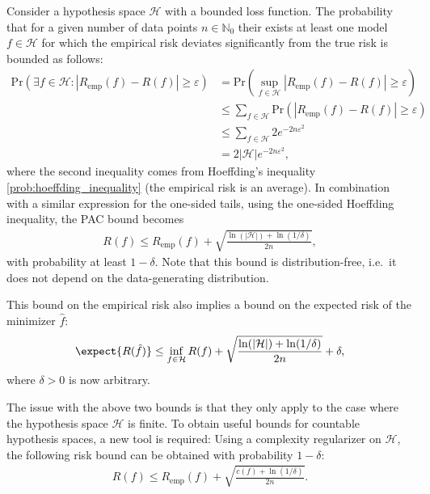     \begin{property}
        Consider a hypothesis space $\mathcal{H}$ with a bounded loss function. The probability that for a given number of data points $n\in\mathbb{N}_0$ their exists at least one model $f\in\mathcal{H}$ for which the empirical risk deviates significantly from the true risk is bounded as follows:
        \begin{align}
            \mathrm{Pr}(\exists f\in\mathcal{H}:|R_\mathrm{emp}(f)-R(f)|\geq\varepsilon) &= \mathrm{Pr}(\sup_{f\in\mathcal{H}}|R_\mathrm{emp}(f)-R(f)|\geq\varepsilon)\nonumber\\
            &\leq\sum_{f\in\mathcal{H}}\mathrm{Pr}(|R_\mathrm{emp}(f)-R(f)|\geq\varepsilon)\nonumber\\
            &\leq\sum_{f\in\mathcal{H}}2e^{-2n\varepsilon^2}\nonumber\\
            &=2|\mathcal{H}|e^{-2n\varepsilon^2},
        \end{align}
        where the second inequality comes from Hoeffding's inequality \ref{prob:hoeffding_inequality} (the empirical risk is an average). In combination with a similar expression for the one-sided tails, using the one-sided Hoeffding inequality, the PAC bound becomes
        \begin{gather}
            R(f)\leq R_\mathrm{emp}(f) + \sqrt{\frac{\ln(|\mathcal{H}|)+\ln(1/\delta)}{2n}},
        \end{gather}
        with probability at least $1-\delta$. Note that this bound is distribution-free, i.e.~it does not depend on the data-generating distribution.

        This bound on the empirical risk also implies a bound on the expected risk of the minimizer $\hat{f}$:
        \begin{gather}
            \expect{R(\hat{f})}\leq\inf_{f\in\mathcal{H}}R(f)+\sqrt{\frac{\ln(|\mathcal{H}|)+\ln(1/\delta)}{2n}}+\delta,
        \end{gather}
        where $\delta>0$ is now arbitrary.
    \end{property}

    The issue with the above two bounds is that they only apply to the case where the hypothesis space $\mathcal{H}$ is finite. To obtain useful bounds for countable hypothesis spaces, a new tool is required:
    Using a complexity regularizer on $\mathcal{H}$, the following risk bound can be obtained with probability $1-\delta$:
    \begin{gather}
        R(f)\leq R_\mathrm{emp}(f) + \sqrt{\frac{c(f)+\ln(1/\delta)}{2n}}.
    \end{gather}

